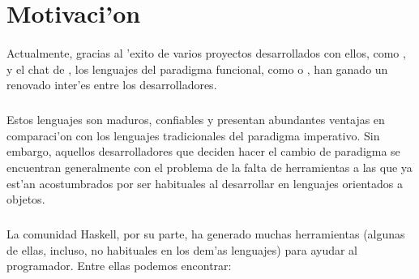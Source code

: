 \documentclass[a4paper]{article}
\begin{document}
\newpage
\tableofcontents

\newpage
\section{Motivaci'on}

\paragraph{}Actualmente, gracias al 'exito de varios proyectos desarrollados con ellos, como ,  y el chat de , los lenguajes del paradigma funcional, como  o , han ganado un renovado inter'es entre los desarrolladores.
\subparagraph{}Estos lenguajes son maduros, confiables y presentan abundantes ventajas en comparaci'on con los lenguajes tradicionales del paradigma imperativo.  Sin embargo, aquellos desarrolladores que deciden hacer el cambio de paradigma se encuentran generalmente con el problema de la falta de herramientas a las que ya est'an acostumbrados por ser habituales al desarrollar en lenguajes orientados a objetos.
\subparagraph{}La comunidad Haskell, por su parte, ha generado muchas herramientas (algunas de ellas, incluso, no habituales en los dem'as lenguajes) para ayudar al programador.  Entre ellas podemos encontrar:
\end{document}
